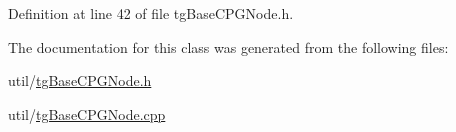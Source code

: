 Definition at line 42 of file tg\-Base\-C\-P\-G\-Node.\-h.



The documentation for this class was generated from the following files\-:\begin{DoxyCompactItemize}
\item 
util/\hyperlink{tg_base_c_p_g_node_8h}{tg\-Base\-C\-P\-G\-Node.\-h}\item 
util/\hyperlink{tg_base_c_p_g_node_8cpp}{tg\-Base\-C\-P\-G\-Node.\-cpp}\end{DoxyCompactItemize}
